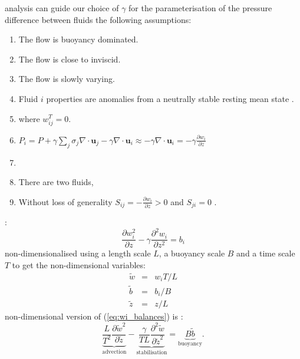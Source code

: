 \documentclass[draft]{agujournal2019}
\begin{document}
 analysis can guide our choice of $\gamma$ for the parameterisation of the pressure difference between fluids  the following assumptions:
\begin{enumerate}
\item The flow is buoyancy dominated.
\item The flow is close to inviscid.
\item The flow is slowly varying.
\item Fluid $i$ properties are anomalies from a neutrally stable resting
mean state 
.
\item {} where $w_{ij}^{T}=0$.
\item $P_{i} = P + \gamma\sum_j \sigma_j\nabla\cdot\mathbf{u}_j 
                              - \gamma\nabla\cdot\mathbf{u}_{i}
             \approx-\gamma\nabla\cdot\mathbf{u}_{i}
            =-\gamma\frac{\partial w_{i}}{\partial z}$
\item {}
\item There are two fluids, 
\item Without loss of generality\add[WM]{,}  $S_{ij}=-\frac{\partial w_{i}}{\partial z}>0$
and $S_{ji}=0$ .
\end{enumerate}
:
\begin{equation}
\frac{\partial w_{i}^{2}}{\partial z}-\gamma\frac{\partial^{2}w_{i}}{\partial z^{2}}=b_{i}\label{eq:wi_balances}
\end{equation}
 non-dimensionalised using a length scale $L$, a buoyancy scale
$B$ and a time scale $T$ to get the non-dimensional variables:
\begin{eqnarray*}
\tilde{w} & = & w_{i}T/L\\
\tilde{b} & = & b_{i}/B\\
\tilde{z} & = & z/L
\end{eqnarray*}
 non-dimensional version of (\ref{eq:wi_balances}) is :
\begin{equation}
\underbrace{{\frac{L}{T^{2}}\frac{\partial\tilde{w}^{2}}{\partial\tilde{z}}}}_{\text{advection}}-\underbrace{{\frac{\gamma}{TL}\frac{\partial^{2}\tilde{w}}{\partial\tilde{z}^{2}}}}_{\text{stabilisation}}=\underbrace{B\tilde{b}}_{\text{buoyancy}}.\label{eq:wi_nonDomTmp}
\end{equation}
\end{document}
